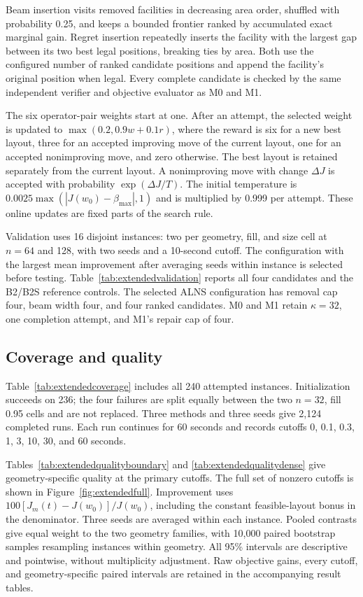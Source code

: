 \documentclass[11pt]{article}
\begin{document}
Beam insertion visits removed facilities in decreasing area order, shuffled
with probability 0.25, and keeps a bounded frontier ranked by accumulated
exact marginal gain. Regret insertion repeatedly inserts the facility with
the largest gap between its two best legal positions, breaking ties by area.
Both use the configured number of ranked candidate positions and append the
facility's original position when legal. Every complete candidate is checked
by the same independent verifier and objective evaluator as M0 and M1.

The six operator-pair weights start at one. After an attempt, the selected
weight is updated to $\max(0.2,0.9w+0.1r)$, where the reward is six for
a new best layout, three for an accepted improving move of the current
layout, one for an accepted nonimproving move, and zero otherwise. The best
layout is retained separately from the current layout. A nonimproving move
with change $\Delta J$ is accepted with probability
$\exp(\Delta J/T)$. The initial temperature is
$0.0025\max(|J(w_0)-\beta_{\max}|,1)$ and is multiplied by 0.999 per attempt.
These online updates are fixed parts of the search rule.

Validation uses 16 disjoint instances: two per geometry, fill, and size cell
at $n=64$ and 128, with two seeds and a 10-second cutoff. The configuration
with the largest mean improvement after averaging seeds within instance is
selected before testing. Table~\ref{tab:extendedvalidation} reports all four
candidates and the B2/B2S reference controls. The selected ALNS configuration
has removal cap four, beam width four, and four ranked candidates. M0 and M1
retain $\kappa=32$, one completion attempt, and M1's repair cap of four.

\ExtendedValidationTable

\subsection{Coverage and quality}
Table~\ref{tab:extendedcoverage} includes all 240 attempted instances.
Initialization succeeds on 236; the four failures are split equally between
the two $n=32$, fill 0.95 cells and are not replaced. Three methods and three
seeds give 2,124 completed runs. Each run continues for 60 seconds and records
cutoffs 0, 0.1, 0.3, 1, 3, 10, 30, and 60 seconds.

\ExtendedCoverageTable

Tables~\ref{tab:extendedqualityboundary} and \ref{tab:extendedqualitydense}
give geometry-specific quality at the primary cutoffs. The full set of
nonzero cutoffs is shown in Figure~\ref{fig:extendedfull}. Improvement uses
$100[J_m(t)-J(w_0)]/J(w_0)$, including the constant feasible-layout bonus
in the denominator. Three seeds are averaged within each instance. Pooled
contrasts give equal weight to the two geometry families, with 10,000 paired
bootstrap samples resampling instances within geometry. All 95\% intervals
are descriptive and pointwise, without multiplicity adjustment. Raw objective
gains, every cutoff, and geometry-specific paired intervals are retained in
the accompanying result tables.
\end{document}

